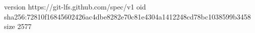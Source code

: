 version https://git-lfs.github.com/spec/v1
oid sha256:72810f16845602426ac4dbe8282e70c81e4304a1412248cd78bc1038599b3458
size 2577
